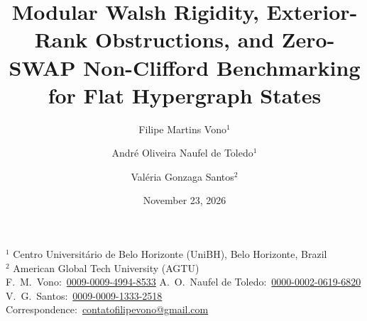 \documentclass[11pt,a4paper]{article}
\title{\textbf{Modular Walsh Rigidity, Exterior-Rank Obstructions, and Zero-SWAP Non-Clifford Benchmarking for Flat Hypergraph States}}
\author{
  Filipe Martins Vono$^{1}$ \and
  Andr\'e Oliveira Naufel de Toledo$^{1}$ \and
  Val\'eria Gonzaga Santos$^{2}$
}
\date{November 23, 2026}
\begin{document}
\maketitle
\begin{center}\small
$^{1}$ Centro Universit\'ario de Belo Horizonte (UniBH), Belo Horizonte, Brazil\\
$^{2}$ American Global Tech University (AGTU)\\[4pt]
F.\ M.\ Vono:~\href{https://orcid.org/0009-0009-4994-8533}{0009-0009-4994-8533}\quad
A.\ O.\ Naufel de Toledo:~\href{https://orcid.org/0000-0002-0619-6820}{0000-0002-0619-6820}\\
V.\ G.\ Santos:~\href{https://orcid.org/0009-0009-1333-2518}{0009-0009-1333-2518}\quad
Correspondence:~\href{mailto:contatofilipevono@gmail.com}{contatofilipevono@gmail.com}
\end{center}
\end{document}
